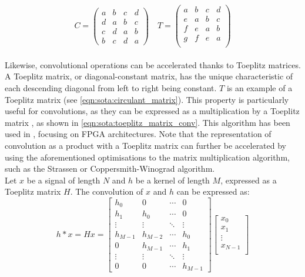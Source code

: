 \begin{equation}
  \label{eqn:sota:circulant_matrix}
  C =
  \begin{pmatrix}
    a & b & c & d \\
    d & a & b & c \\
    c & d & a & b \\
    b & c & d & a
  \end{pmatrix}
  \quad
  T =
  \begin{pmatrix}
    a & b & c & d \\
    e & a & b & c \\
    f & e & a & b \\
    g & f & e & a \\
  \end{pmatrix}
\end{equation}\\

Likewise, convolutional operations can be accelerated thanks to Toeplitz
matrices. A Toeplitz matrix, or diagonal-constant matrix, has the unique
characteristic of each descending diagonal from left to right being constant.
$T$ is an example of a Toeplitz matrix (see \cref{eqn:sota:circulant_matrix}).
This property is particularly useful for convolutions, as they can be expressed
as a multiplication by a Toeplitz matrix \cite{gray2006toeplitz}, as shown in
\cref{eqn:sota:toeplitz_matrix_conv}. This algorithm has been used in
\cite{liao2019compressing}, focusing on \ac{FPGA} architectures. Note that the
representation of convolution as a product with a Toeplitz matrix can further be
accelerated by using the aforementioned optimisations to the matrix
multiplication algorithm, such as the Strassen or Coppersmith-Winograd
algorithm.\\


Let $x$ be a signal of length $N$ and $h$ be a kernel of length $M$, expressed
as a Toeplitz matrix $H$. The convolution of $x$ and $h$ can be expressed as:\\

\begin{equation}
  \label{eqn:sota:toeplitz_matrix_conv}
  h * x = Hx = \begin{bmatrix}
    h_0     & 0       & \cdots & 0       \\
    h_1     & h_0     & \cdots & 0       \\
    \vdots  & \vdots  & \ddots & \vdots  \\
    h_{M-1} & h_{M-2} & \cdots & h_0     \\
    0       & h_{M-1} & \cdots & h_1     \\
    \vdots  & \vdots  & \ddots & \vdots  \\
    0       & 0       & \cdots & h_{M-1}
  \end{bmatrix}
  \begin{bmatrix}
    x_0     \\
    x_1     \\
    \vdots  \\
    x_{N-1} \\
  \end{bmatrix}
\end{equation}\\

